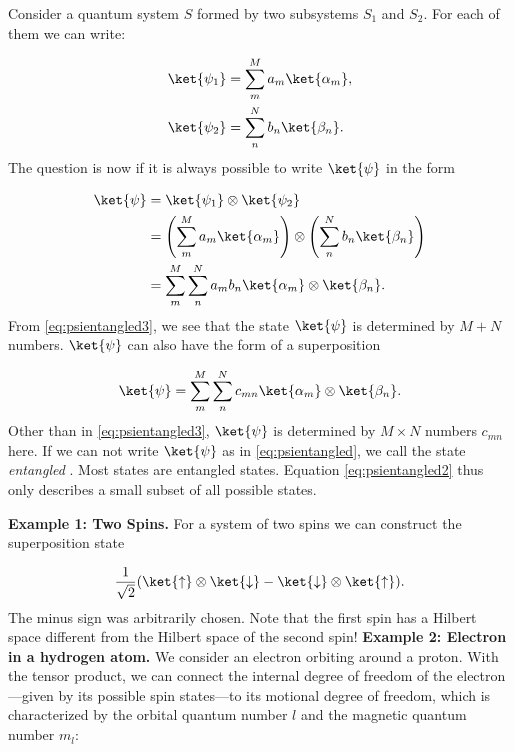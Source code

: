 			Consider a quantum system $S$ formed by two subsystems $S_1$ and $S_2$. For each of them we can write:

\begin{align}
				\ket{\psi_1}&=\sum_m^M a_m \ket{\alpha_m},\\
				\ket{\psi_2}&=\sum_n^N b_n \ket{\beta_n}.
			
\end{align}
			The question is now if it is always possible to write $\ket{\psi}$ in the form

\begin{align}
 \label{eq:psientangled} 
	\ket{\psi}	&=\ket{\psi_1}\otimes\ket{\psi_2}\\
							&=\left(\sum_m^M a_m \ket{\alpha_m}\right) \otimes \left(\sum_n^N b_n \ket{\beta_n}\right) \label{eq:psientangled2} \\
							&=\sum_m^M \sum_n^N a_m b_n \ket{\alpha_m} \otimes \ket{\beta_n}. \label{eq:psientangled3} 
			
\end{align}
						From \eqref{eq:psientangled3}, we see that the state $\ket{\psi}$ is determined by $M + N$ numbers. $\ket{\psi}$ can also have the form of a superposition

\begin{align}
\ket{\psi}=\sum_m^M \sum_n^N c_{mn}\ket{\alpha_m}\otimes \ket{\beta_n}.
\end{align}
Other than in \eqref{eq:psientangled3}, $\ket{\psi}$ is determined by $M \times N$ numbers $c_{mn}$ here. If we can not write $\ket{\psi}$ as in \eqref{eq:psientangled}, we call the state \emph{entangled} . Most states are entangled states. Equation \eqref{eq:psientangled2} thus only describes a small subset of all possible states.

\textbf{Example 1: Two Spins.}\label{sec:examplespin}  For a system of two spins we can construct the superposition state

\begin{align}
						\frac{1}{\sqrt{2}}(\ket{\uparrow}\otimes\ket{\downarrow}-\ket{\downarrow}\otimes\ket{\uparrow}).
					
\end{align}
	The minus sign was arbitrarily chosen.
					Note that the first spin has a Hilbert space different from the Hilbert space of the second spin!
				\textbf{Example 2: Electron in a hydrogen atom.} We consider an electron orbiting around a proton. With the tensor product, we can connect the internal degree of freedom of the electron---given by its possible spin states---to its motional degree of freedom, which is characterized by the orbital quantum number $l$ and the magnetic quantum number $m_l$:

